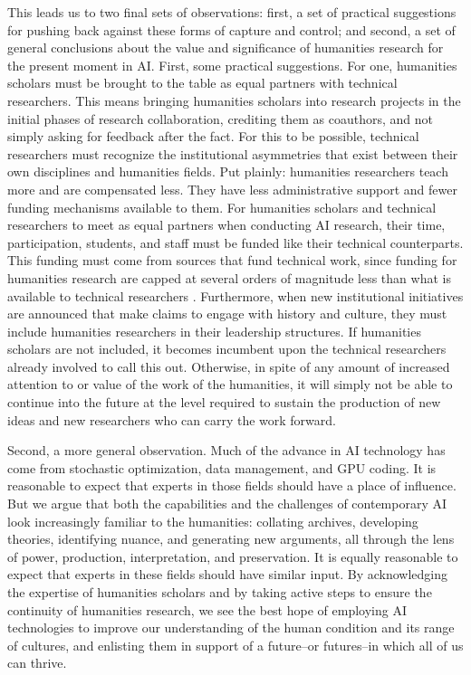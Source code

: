 This leads us to two final sets of observations: first, a set of practical suggestions for pushing back against these forms of capture and control; and second, a set of general conclusions about the value and significance of humanities research for the present moment in AI. First, some practical suggestions. For one, humanities scholars must be brought to the table as equal partners with technical researchers. This means bringing humanities scholars into research projects in the initial phases of research collaboration, crediting them as coauthors, and not simply asking for feedback after the fact. For this to be possible, technical researchers must recognize the institutional asymmetries that exist between their own disciplines and humanities fields. Put plainly: humanities researchers teach more and are compensated less. They have less administrative support and fewer funding mechanisms available to them. For humanities scholars and technical researchers to meet as equal partners when conducting AI research, their time, participation, students, and staff must be funded like their technical counterparts. This funding must come from sources that fund technical work, since funding for humanities research are capped at several orders of magnitude less than what is available to technical researchers \cite{newfield_humanities_2025}. Furthermore, when new institutional initiatives are announced that make claims to engage with history and culture, they must include humanities researchers in their leadership structures. If humanities scholars are not included, it becomes incumbent upon the technical researchers already involved to call this out. Otherwise, in spite of any amount of increased attention to or value of the work of the humanities, it will simply not be able to continue into the future at the level required to sustain the production of new ideas and new researchers who can carry the work forward.   

Second, a more general observation. Much of the advance in AI technology has come from stochastic optimization, data management, and GPU coding. It is reasonable to expect that experts in those fields should have a place of influence. But we argue that both the capabilities and the challenges of contemporary AI look increasingly familiar to the humanities: collating archives, developing theories, identifying nuance, and generating new arguments, all through the lens of power, production, interpretation, and preservation. It is equally reasonable to expect that experts in these fields should have similar input. By acknowledging the expertise of humanities scholars and by taking active steps to ensure the continuity of humanities research, we see the best hope of employing AI technologies to improve our understanding of the human condition and its range of cultures, and enlisting them in support of a future–or futures–in which all of us can thrive.

